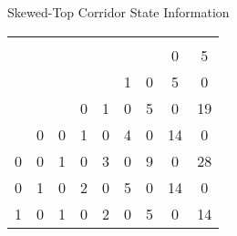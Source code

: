 \documentclass[10pt,a4paper]{article}
\begin{document}
\caption{Skewed-Top Corridor State Information}
  \begin{center}
    \begin{tabular}{ |c|c|c|c|c|c|c|c|c| } 
      \hline
        &    &   &    &    &   &   &    & \\ 
        &    &   &    &    &   &   & 0  &5 \\ 
        &    &   &    &    & 1 & 0 & 5  &0 \\ 
        &    &   &  0 &  1 & 0 & 5 & 0  &19 \\ 
        &  0 & 0 &  1 &  0 & 4 & 0 & 14 &0 \\ 
      0 &  0 & 1 &  0 &  3 & 0 & 9 & 0  &28 \\ 
      0 &  1 & 0 &  2 &  0 & 5 & 0 & 14 &0 \\ 
      1 &  0 & 1 &  0 &  2 & 0 & 5 & 0  &14 \\ 
      \hline
    \end{tabular}
  \end{center}
\end{document}
